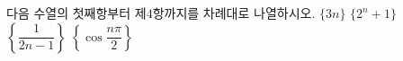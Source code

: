 다음 수열의 첫째항부터 제$4$항까지를 차례대로 나열하시오.
 $\{3n\}$
 $\{2^n+1\}$
 $\left\{\dfrac{1}{2n-1}\right\}$
 $\left\{\cos\dfrac{n\pi}{2}\right\}$
